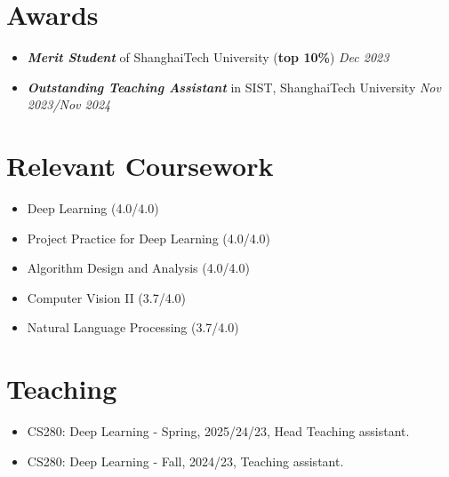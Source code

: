 \documentclass[letterpaper,11pt]{article}
\newcommand{\resumeItem}[1]{
  \item\small{
    {#1 \vspace{-2pt}}
  }
}
\newcommand{\resumeSubHeadingListStart}{\begin{itemize}[leftmargin=0.0in, label={}]}
\newcommand{\resumeSubHeadingListEnd}{\end{itemize}}
\newcommand{\resumeItemListStart}{\begin{itemize}}
\newcommand{\resumeItemListEnd}{\end{itemize}\vspace{-5pt}}
\begin{document}

\section{Awards}
\resumeItemListStart
\itemsep -0pt
\resumeItem{\textit{\textbf{Merit Student}} of ShanghaiTech University (\textbf{top 10\%})}\hfill{\textit{Dec 2023}}
\resumeItem{\textit{\textbf{Outstanding Teaching Assistant}} in SIST, ShanghaiTech University} \hfill{\textit{Nov 2023/Nov 2024}}
\resumeItemListEnd
\vspace{-6pt}

\section{Relevant Coursework}
        \begin{multicols}{2}
            \begin{itemize}[itemsep=-3pt, parsep=3pt]
                \item\small Deep Learning (4.0/4.0)
                \item\small Project Practice for Deep Learning (4.0/4.0)
                \item Algorithm Design and Analysis (4.0/4.0)
                \item Computer Vision II (3.7/4.0)
                \item Natural Language Processing (3.7/4.0)
                
            \end{itemize}
        \end{multicols}
        \vspace{-2pt}

\section{Teaching}
\resumeItemListStart
\resumeItem{CS280: Deep Learning - Spring, 2025/24/23, Head Teaching assistant.}
\resumeItem{CS280: Deep Learning - Fall, 2024/23, Teaching assistant.}
\resumeItemListEnd
\vspace{-6pt}
\end{document}
